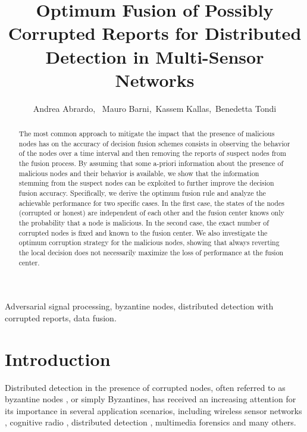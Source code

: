 \documentclass[10pt,peerreview,draftcls,onecolumn]{IEEEtran}
\begin{document}
\title{Optimum Fusion of Possibly Corrupted Reports for Distributed Detection in Multi-Sensor Networks}




\author{Andrea Abrardo,~ Mauro Barni,~Kassem Kallas,~Benedetta Tondi


}
\maketitle

\begin{abstract}
The most common approach to mitigate the impact that the presence of malicious nodes has on the accuracy of decision fusion schemes consists in  observing the behavior of the nodes over a time interval  and then removing the reports of suspect nodes from the fusion process. By assuming that some a-priori information about the presence of malicious nodes and their behavior is available, we show that the information stemming from the suspect nodes can be exploited to further improve the decision fusion accuracy. Specifically, we derive the optimum fusion rule and analyze the achievable performance for two specific cases. In the first case, the states of the nodes (corrupted or honest) are independent of each other and the fusion center knows only the probability that a node is malicious. In the second case, the exact number of corrupted nodes is fixed and known to the fusion center. We also investigate the optimum corruption strategy for the malicious nodes, showing that always reverting the local decision does not necessarily maximize the loss of performance at the fusion center.
\end{abstract}

\begin{IEEEkeywords}
Adversarial signal processing, byzantine nodes, distributed detection with corrupted reports, data fusion.
\end{IEEEkeywords}

\IEEEpeerreviewmaketitle

\section{Introduction}
\label{sec.intro}

Distributed detection in the presence of corrupted nodes, often referred to as byzantine nodes \cite{Vemp13}, or simply Byzantines, has received an increasing attention for its importance in several application scenarios, including wireless sensor networks \cite{WSNvarshney,WSNanomalyDet}, cognitive radio \cite{WLSH10,Raw11}, distributed detection \cite{Mar09}, multimedia forensics \cite{Bar13} and many others.
\end{document}
